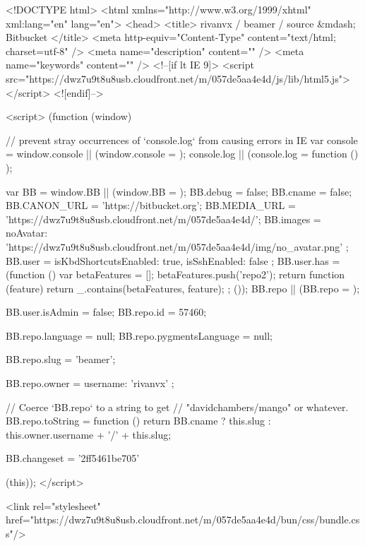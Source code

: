 

<!DOCTYPE html>
<html xmlns="http://www.w3.org/1999/xhtml" xml:lang="en" lang="en">
<head>
  <title>
  rivanvx / beamer / source &mdash; Bitbucket
</title>
  <meta http-equiv="Content-Type" content="text/html; charset=utf-8" />
  <meta name="description" content="" />
  <meta name="keywords" content="" />
  <!--[if lt IE 9]>
  <script src="https://dwz7u9t8u8usb.cloudfront.net/m/057de5aa4e4d/js/lib/html5.js"></script>
  <![endif]-->

  <script>
    (function (window) {
      // prevent stray occurrences of `console.log` from causing errors in IE
      var console = window.console || (window.console = {});
      console.log || (console.log = function () {});

      var BB = window.BB || (window.BB = {});
      BB.debug = false;
      BB.cname = false;
      BB.CANON_URL = 'https://bitbucket.org';
      BB.MEDIA_URL = 'https://dwz7u9t8u8usb.cloudfront.net/m/057de5aa4e4d/';
      BB.images = {
        noAvatar: 'https://dwz7u9t8u8usb.cloudfront.net/m/057de5aa4e4d/img/no_avatar.png'
      };
      BB.user = {
        isKbdShortcutsEnabled: true,
        isSshEnabled: false
      };
      BB.user.has = (function () {
        var betaFeatures = [];
        betaFeatures.push('repo2');
        return function (feature) {
          return _.contains(betaFeatures, feature);
        };
      }());
      BB.repo || (BB.repo = {});
  
  
      BB.user.isAdmin = false;
      BB.repo.id = 57460;
    
    
      BB.repo.language = null;
      BB.repo.pygmentsLanguage = null;
    
    
      BB.repo.slug = 'beamer';
    
    
      BB.repo.owner = {
        username: 'rivanvx'
      };
    
      // Coerce `BB.repo` to a string to get
      // "davidchambers/mango" or whatever.
      BB.repo.toString = function () {
        return BB.cname ? this.slug : this.owner.username + '/' + this.slug;
      }
    
    
      BB.changeset = '2ff5461be705'
    
    
  
    }(this));
  </script>

  


  <link rel="stylesheet" href="https://dwz7u9t8u8usb.cloudfront.net/m/057de5aa4e4d/bun/css/bundle.css"/>



